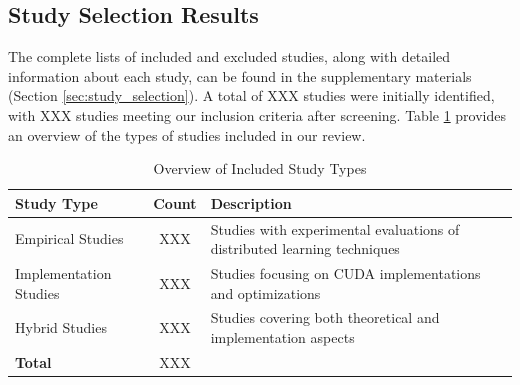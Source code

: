 \subsection{Study Selection Results}
\label{sec:study_selection_results}
The complete lists of included and excluded studies, along with detailed information about each study, can be found in the supplementary materials (Section \ref{sec:study_selection}). A total of XXX studies were initially identified, with XXX studies meeting our inclusion criteria after screening. Table \ref{tab:study_types} provides an overview of the types of studies included in our review.

\begin{table}[h]
    \centering
    \caption{Overview of Included Study Types}
    \label{tab:study_types}
    \begin{tabular}{|l|c|p{8cm}|}
        \hline
        \textbf{Study Type} & \textbf{Count} & \textbf{Description} \\
        \hline
        Empirical Studies & XXX & Studies with experimental evaluations of distributed learning techniques \\
        \hline
        Implementation Studies & XXX & Studies focusing on CUDA implementations and optimizations \\
        \hline
        Hybrid Studies & XXX & Studies covering both theoretical and implementation aspects \\
        \hline
        \textbf{Total} & XXX & \\
        \hline
    \end{tabular}
\end{table}

